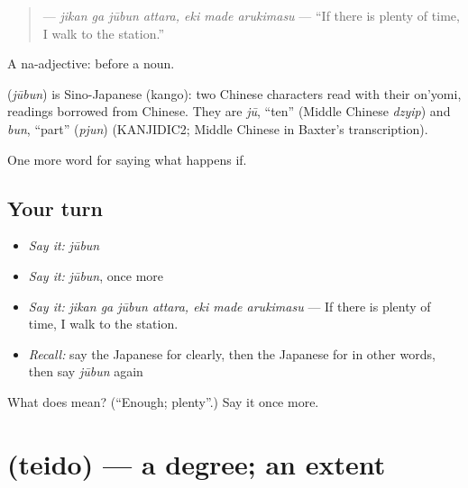 \begin{quote}
\textbf{   } — \emph{jikan ga jūbun attara, eki made arukimasu} — \textquotedblleft{}If there is plenty of time, I walk to the station.\textquotedblright{}
\end{quote}

A na-adjective:  before a noun.

\begin{cousinweb}
\textbf{} (\emph{jūbun}) is Sino-Japanese (kango): two Chinese characters read with their on'yomi, readings borrowed from Chinese. They are \emph{jū}, \textquotedblleft{}ten\textquotedblright{} (Middle Chinese \emph{dzyip}) and \emph{bun}, \textquotedblleft{}part\textquotedblright{} (\emph{pjun}) (KANJIDIC2; Middle Chinese in Baxter's transcription).
\end{cousinweb}

\begin{grammarlens}[title={What you've built}]
One more word for saying what happens if.
\end{grammarlens}

\subsection*{Your turn}
\begin{itemize}
\raggedright
  \item \emph{Say it:} \emph{jūbun}
  \item \emph{Say it:} \emph{jūbun}, once more
  \item \emph{Say it:} \emph{jikan ga jūbun attara, eki made arukimasu} — If there is plenty of time, I walk to the station.
  \item \emph{Recall:} say the Japanese for clearly, then the Japanese for in other words, then say \emph{jūbun} again
\end{itemize}

\begin{tcolorbox}[breakable,colback=teal!4,colframe=teal!35!black,title={Before you move on}]
What does  mean? (\textquotedblleft{}Enough; plenty\textquotedblright{}.) Say it once more.
\end{tcolorbox}
\section[\texorpdfstring{\ja{ていど} (teido)}{ていど (teido)}]{ (teido) — a degree; an extent}

